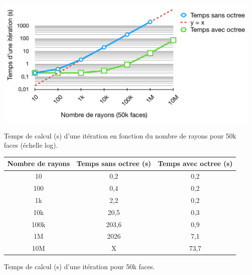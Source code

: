  \begin{figureth}
	\includegraphics[width=\linewidth]{images/complexite2}
	\caption{Temps de calcul (s) d'une itération en fonction du nombre de rayons pour 50k faces (échelle log).}
	\label{complexite2}
\end{figureth}

\begin{tableth}
	\begin{tabular}{| c | c | c |}
		\hline
		Nombre de rayons & Temps \textbf{sans} \gls{octree} (s)& Temps \textbf{avec} \gls{octree} (s)\\
		  \hline
		  \hline
		   10 &0,2&	0,2 \\
		   \hline
		100 &0,4	&0,2 \\
		   \hline
		1k & 2,2	&0,2\\
		   \hline
		10k & 20,5&	0,3\\
		   \hline
		100k & 203,6&	0,9\\
		   \hline
		1M &2026 &	7,1 \\
		\hline
		10M & X &	73,7 \\
		\hline
	 \end{tabular}
	\caption{Temps de calcul (s) d'une itération pour 50k faces.}
	\label{tabComplexite2}
\end{tableth}

